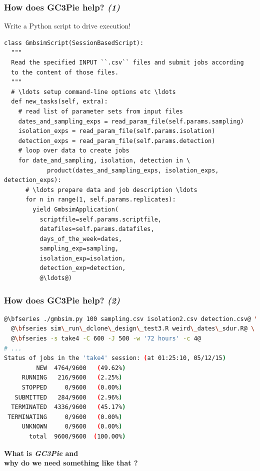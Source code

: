 \documentclass[english,serif,mathserif,xcolor=pdftex,dvipsnames,table]{beamer}
\begin{document}
\begin{frame}[fragile]
  \frametitle{How does GC3Pie help? \em (1)}

  \begin{center}
    Write a Python script to drive execution!
  \end{center}

  \begin{lstlisting}[showstringspaces=false,basicstyle=\tiny\ttfamily]
class GmbsimScript(SessionBasedScript):
  """
  Read the specified INPUT ``.csv`` files and submit jobs according
  to the content of those files.
  """
  # \ldots setup command-line options etc \ldots
  def new_tasks(self, extra):
    # read list of parameter sets from input files
    dates_and_sampling_exps = read_param_file(self.params.sampling)
    isolation_exps = read_param_file(self.params.isolation)
    detection_exps = read_param_file(self.params.detection)
    # loop over data to create jobs
    for date_and_sampling, isolation, detection in \
            product(dates_and_sampling_exps, isolation_exps, detection_exps):
      # \ldots prepare data and job description \ldots
      for n in range(1, self.params.replicates):
        yield GmbsimApplication(
          scriptfile=self.params.scriptfile,
          datafiles=self.params.datafiles,
          days_of_the_week=dates,
          sampling_exp=sampling,
          isolation_exp=isolation,
          detection_exp=detection,
          @\ldots@)
  \end{lstlisting}
\end{frame}


\begin{frame}[fragile]
  \frametitle{How does GC3Pie help? \em (2)}

  \begin{lstlisting}[language=sh,basicstyle=\scriptsize\ttfamily]
@\bfseries ./gmbsim.py 100 sampling.csv isolation2.csv detection.csv@ \
  @\bfseries sim\_run\_dclone\_design\_test3.R weird\_dates\_sdur.R@ \
  @\bfseries -s take4 -C 600 -J 500 -w '72 hours' -c 4@
# ...
Status of jobs in the 'take4' session: (at 01:25:10, 05/12/15)
         NEW  4764/9600   (49.62%)
     RUNNING   216/9600   (2.25%)
     STOPPED     0/9600   (0.00%)
   SUBMITTED   284/9600   (2.96%)
  TERMINATED  4336/9600   (45.17%)
 TERMINATING     0/9600   (0.00%)
     UNKNOWN     0/9600   (0.00%)
       total  9600/9600  (100.00%)
     \end{lstlisting}
\end{frame}


\begin{frame}
  \begin{center}
    \bfseries\huge
    {What is {\em GC3Pie} and \\ why do we need something like that ?}
  \end{center}
\end{frame}
\end{document}
